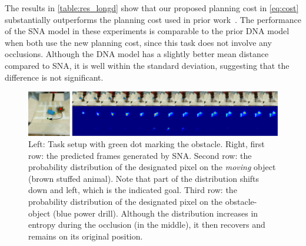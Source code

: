 The results in \autoref{table:res_longd} show that our proposed planning cost in \autoref{eq:cost} substantially outperforms the planning cost used in prior work~\cite{foresight}. The performance of the SNA model in these experiments is comparable to the prior DNA model~\cite{foresight} when both use the new planning cost, since this task does not involve any occlusions. Although the DNA model has a slightly better mean distance compared to SNA, it is well within the standard deviation, suggesting that the difference is not significant.

\begin{figure}
\centering
   \includegraphics[width=1\linewidth]{images_sna/multiobject_qualitative/avoid_obstacle.pdf}
\caption{Left: Task setup with green dot marking the obstacle. Right, first row: the predicted frames generated by SNA. Second row: the probability distribution of the designated pixel on the \textit{moving} object (brown stuffed animal). Note that part of the distribution shifts down and left, which is the indicated goal. Third row: the probability distribution of the designated pixel on the obstacle-object (blue power drill). Although the distribution increases in entropy during the occlusion (in the middle), it then recovers and remains on its original position.
\label{fig:goingaroundocclusion}}
\end{figure}

